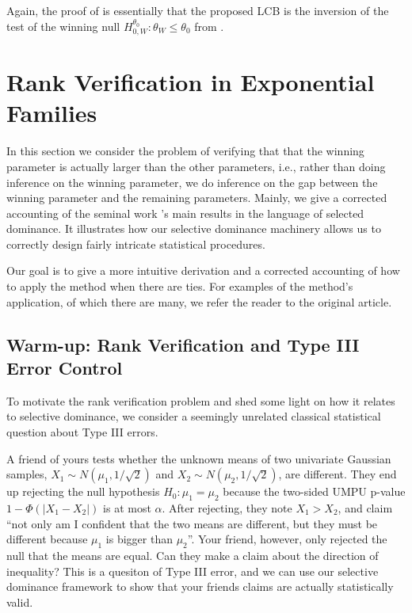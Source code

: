 \documentclass{article}
\begin{document}
Again, the proof of  is essentially that the proposed LCB is the inversion of the test of the winning null $H^{\theta_0}_{0, W}: \theta_W \leq \theta_0$ from . 


\section{Rank Verification in Exponential Families}
\label{sec:rank_verification}

In this section we consider the problem of verifying that that the winning parameter is actually larger than the other parameters, i.e., rather than doing inference on the winning parameter, we do inference on the gap between the winning parameter and the remaining parameters. Mainly, we give a corrected accounting of the seminal work \cite{Hung2019}'s main results in the language of selected dominance. It illustrates how our selective dominance machinery allows us to correctly design fairly intricate statistical procedures.  

Our goal is to give a more intuitive derivation and a corrected accounting of how to apply the method when there are ties. For examples of the method's application, of which there are many, we refer the reader to the original article. 

\subsection{Warm-up: Rank Verification and Type III Error Control}

To motivate the rank verification problem and shed some light on how it relates to selective dominance, we consider a seemingly unrelated classical statistical question about Type III errors. 

A friend of yours tests whether the unknown means of two univariate Gaussian samples, $X_1 \sim N(\mu_1, 1/\sqrt{2})$ and $X_2 \sim N(\mu_2, 1/\sqrt{2})$, are different. They end up rejecting the null hypothesis $H_0: \mu_1 = \mu_2$ because the two-sided UMPU p-value $1 - \Phi(|X_1 - X_2|)$ is at most $\alpha$. After rejecting, they note $X_1 > X_2$, and claim ``not only am I confident that the two means are different, but they must be different because $\mu_1$ is bigger than $\mu_2$''. Your friend, however, only rejected the null that the means are equal. Can they make a claim about the direction of inequality? This is a quesiton of Type III error, and we can use our selective dominance framework to show that your friends claims are actually statistically valid. 
\end{document}
